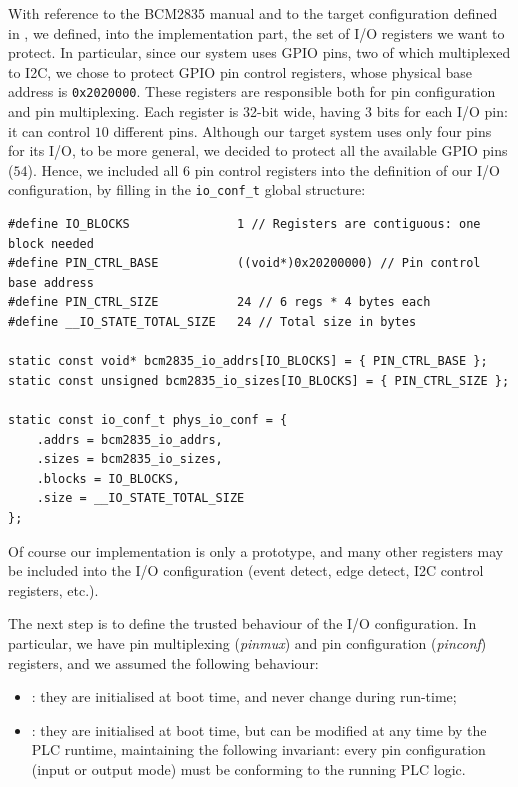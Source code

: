 With reference to the BCM2835 manual \cite{bcm2835} and to the target configuration defined in ,
we defined, into the implementation part, the set of I/O registers we want to protect.
In particular, since our system uses GPIO pins, two of which multiplexed to I2C, we chose to protect GPIO pin control registers, whose physical base address is \verb|0x2020000|.
These registers are responsible both for pin configuration and pin multiplexing. Each register is 32-bit wide, having 3 bits for each I/O pin: it can control $10$ different pins.
Although our target system uses only four pins for its I/O, to be more general, we decided to protect all the available GPIO pins ($54$).
Hence, we included all $6$ pin control registers into the definition of our I/O configuration, by filling in the \verb|io_conf_t| global structure:
\begin{lstlisting}
#define IO_BLOCKS            	1 // Registers are contiguous: one block needed
#define PIN_CTRL_BASE        	((void*)0x20200000) // Pin control base address
#define PIN_CTRL_SIZE        	24 // 6 regs * 4 bytes each
#define __IO_STATE_TOTAL_SIZE	24 // Total size in bytes

static const void* bcm2835_io_addrs[IO_BLOCKS] = { PIN_CTRL_BASE };
static const unsigned bcm2835_io_sizes[IO_BLOCKS] = { PIN_CTRL_SIZE };

static const io_conf_t phys_io_conf = {
	.addrs = bcm2835_io_addrs,
	.sizes = bcm2835_io_sizes,
	.blocks = IO_BLOCKS,
	.size = __IO_STATE_TOTAL_SIZE
};
\end{lstlisting}
Of course our implementation is only a prototype, and many other registers may be included into the I/O configuration (\eg event detect, edge detect, I2C control registers, etc.).

The next step is to define the trusted behaviour of the I/O configuration.
In particular, we have pin multiplexing (\emph{pinmux}) and pin configuration (\emph{pinconf}) registers, and we assumed the following behaviour:
\begin{itemize}
	\item {}: they are initialised at boot time, and never change during run-time;
	\item {}: they are initialised at boot time, but can be modified at any time by the PLC runtime, maintaining the following invariant:
		every pin configuration (input or output mode) must be conforming to the running PLC logic.
\end{itemize}

